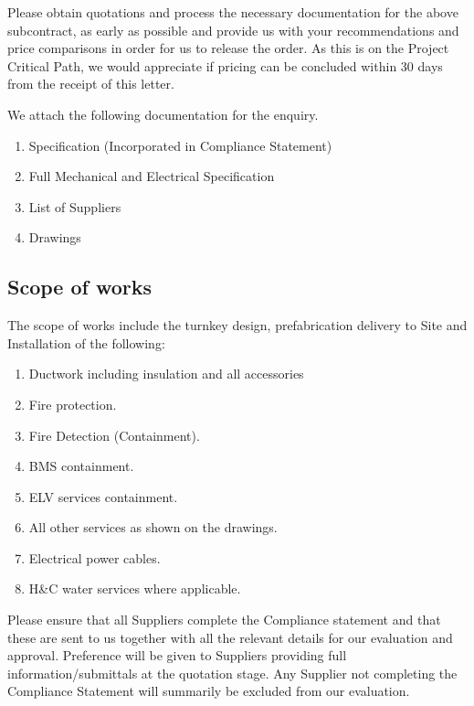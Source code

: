 \documentclass[a4paper,11pt,oneside]{article}
\begin{document}
\begin{mcdletter}


Please obtain quotations and process the necessary documentation for the above subcontract, as early as possible and provide us with your recommendations and price comparisons in order for us to release the order. As this is on the Project Critical Path, we would appreciate if pricing can be concluded within 30 days from the receipt of this letter.

We attach the following documentation for the enquiry. 

\begin{enumerate}

\item Specification (Incorporated in Compliance Statement)
\item Full Mechanical and Electrical Specification
\item List of Suppliers
\item Drawings
\end{enumerate}

\subsection*{Scope of works}

The scope of works include the turnkey design, prefabrication delivery to Site and Installation of the following:

\begin{enumerate}
\item  Ductwork including insulation and all accessories
\item  Fire protection. 
\item  Fire Detection (Containment).
\item  BMS containment.
\item  ELV services containment.
\item  All other services as shown on the drawings.
\item  Electrical power cables.
\item  H\&C water services where applicable.
\end{enumerate}



Please ensure that all Suppliers complete the Compliance statement and that these are sent to us together with all the relevant details for our evaluation and approval. Preference will be given to Suppliers providing full information/submittals at the quotation stage. Any Supplier not completing the Compliance Statement will summarily be excluded from our evaluation.



\end{mcdletter}
\end{document}

